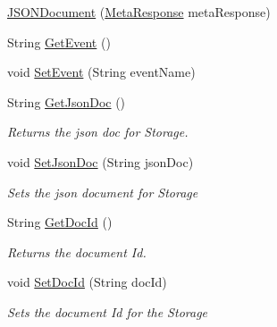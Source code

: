 \begin{DoxyCompactItemize}
\item 
\hyperlink{classcom_1_1shephertz_1_1app42_1_1paas_1_1sdk_1_1csharp_1_1_meta_response_1_1_j_s_o_n_document_a7f999f4e7e9ecd92d714d100d4ac78db}{J\+S\+O\+N\+Document} (\hyperlink{classcom_1_1shephertz_1_1app42_1_1paas_1_1sdk_1_1csharp_1_1_meta_response}{Meta\+Response} meta\+Response)
\item 
String \hyperlink{classcom_1_1shephertz_1_1app42_1_1paas_1_1sdk_1_1csharp_1_1_meta_response_1_1_j_s_o_n_document_a2da844fc11ab4d98b41d19a7b00afc3d}{Get\+Event} ()
\item 
void \hyperlink{classcom_1_1shephertz_1_1app42_1_1paas_1_1sdk_1_1csharp_1_1_meta_response_1_1_j_s_o_n_document_a4dcdf68a0d5ea9b8ce7eb66b37847fd1}{Set\+Event} (String event\+Name)
\item 
String \hyperlink{classcom_1_1shephertz_1_1app42_1_1paas_1_1sdk_1_1csharp_1_1_meta_response_1_1_j_s_o_n_document_a4fcbb5f915edd3627e790a1a1202876c}{Get\+Json\+Doc} ()
\begin{DoxyCompactList}\small\item\em Returns the json doc for Storage. \end{DoxyCompactList}\item 
void \hyperlink{classcom_1_1shephertz_1_1app42_1_1paas_1_1sdk_1_1csharp_1_1_meta_response_1_1_j_s_o_n_document_a8856bdf797a76d4c43df65605578982c}{Set\+Json\+Doc} (String json\+Doc)
\begin{DoxyCompactList}\small\item\em Sets the json document for Storage \end{DoxyCompactList}\item 
String \hyperlink{classcom_1_1shephertz_1_1app42_1_1paas_1_1sdk_1_1csharp_1_1_meta_response_1_1_j_s_o_n_document_a2d1eef4f03ef1038ba2545b18159fc87}{Get\+Doc\+Id} ()
\begin{DoxyCompactList}\small\item\em Returns the document Id. \end{DoxyCompactList}\item 
void \hyperlink{classcom_1_1shephertz_1_1app42_1_1paas_1_1sdk_1_1csharp_1_1_meta_response_1_1_j_s_o_n_document_a131d85d77982a55658ce50816c9906db}{Set\+Doc\+Id} (String doc\+Id)
\begin{DoxyCompactList}\small\item\em Sets the document Id for the Storage \end{DoxyCompactList}\item 

\end{DoxyCompactItemize}
